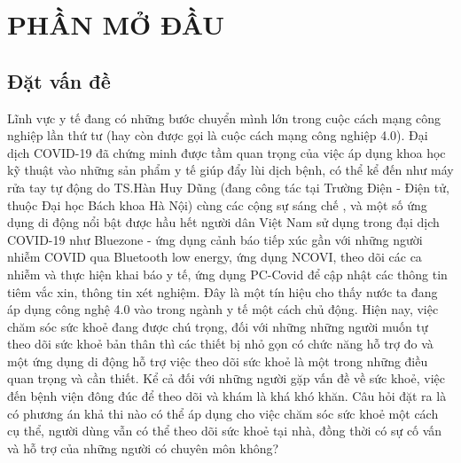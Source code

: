 
\section*{PHẦN MỞ ĐẦU}
\subsection*{Đặt vấn đề}

Lĩnh vực y tế đang có những bước chuyển mình lớn trong cuộc cách mạng công nghiệp lần thứ tư 
(hay còn được gọi là cuộc cách mạng công nghiệp 4.0). Đại dịch COVID-19 đã chứng minh được tầm quan trọng của việc áp dụng
khoa học kỹ thuật vào những sản phẩm y tế giúp đẩy lùi dịch bệnh,
có thể kể đến như máy rửa tay tự động do TS.Hàn Huy Dũng (đang công tác tại Trường Điện - Điện tử, thuộc Đại học Bách khoa Hà Nội) 
cùng các cộng sự sáng chế \cite{ref_thay_dzung}, và một số ứng dụng di động
nổi bật được hầu hết người dân Việt Nam sử dụng trong đại dịch COVID-19 như Bluezone - ứng dụng cảnh báo tiếp xúc gần với
những người nhiễm COVID qua Bluetooth low energy, ứng dụng NCOVI, theo dõi các ca nhiễm và thực hiện khai báo y tế, ứng
dụng PC-Covid để cập nhật các thông tin tiêm vắc xin, thông tin xét nghiệm. Đây là một tín hiệu cho thấy nước ta đang áp
dụng công nghệ 4.0 vào trong ngành y tế một cách chủ động. Hiện nay, việc chăm sóc sức khoẻ đang được chú trọng, đối với 
những những người muốn tự theo dõi sức khoẻ bản thân
thì các thiết bị nhỏ gọn có chức năng hỗ trợ đo và một ứng dụng di động hỗ trợ việc theo dõi sức khoẻ là một trong những
điều quan trọng và cần thiết. Kể cả đối với những người gặp vấn đề về sức khoẻ, việc đến bệnh viện đông đúc để theo dõi
và khám là khá khó khăn. Câu hỏi đặt ra là có phương án khả thi nào có thể áp dụng cho việc chăm sóc sức khoẻ một cách cụ thể, 
người dùng vẫn có thể theo dõi sức khoẻ tại nhà, đồng thời có sự cố vấn và hỗ trợ của những người có chuyên môn không?

